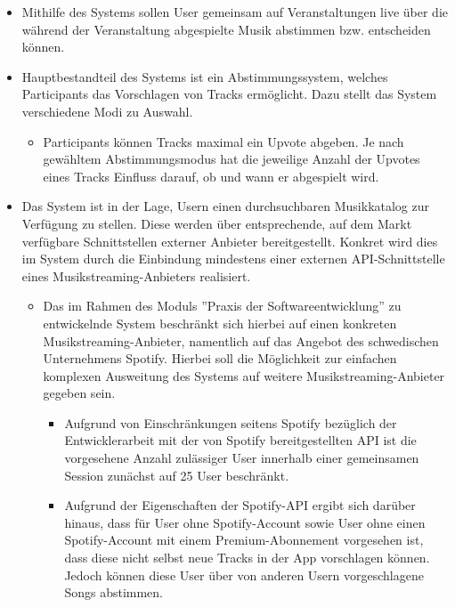\documentclass[oneside, ngerman]{sdqtechreport}
\begin{document}
\begin{itemize}
    \item Mithilfe des Systems sollen User gemeinsam auf Veranstaltungen live über die während der Veranstaltung abgespielte Musik abstimmen bzw. entscheiden können.
    \item Hauptbestandteil des Systems ist ein Abstimmungssystem, welches Participants das Vorschlagen von Tracks ermöglicht. Dazu stellt das System verschiedene Modi zu Auswahl.
    \begin{itemize}
        \item Participants können Tracks maximal ein Upvote abgeben. Je nach gewähltem Abstimmungsmodus hat die jeweilige Anzahl der Upvotes eines Tracks Einfluss darauf, ob und wann er abgespielt wird.
    \end{itemize}
    \item Das System ist in der Lage, Usern einen durchsuchbaren Musikkatalog zur Verfügung zu stellen. Diese werden über entsprechende, auf dem Markt verfügbare Schnittstellen externer Anbieter bereitgestellt. Konkret wird dies im System durch die Einbindung mindestens einer externen API-Schnittstelle eines Musikstreaming-Anbieters realisiert.
    \begin{itemize}
        \item Das im Rahmen des Moduls ''Praxis der Softwareentwicklung'' zu entwickelnde System beschränkt sich hierbei auf einen konkreten Musikstreaming-Anbieter, namentlich auf das Angebot des schwedischen Unternehmens Spotify. Hierbei soll die Möglichkeit zur einfachen komplexen Ausweitung des Systems auf weitere Musikstreaming-Anbieter gegeben sein.
        \begin{itemize}
            \item Aufgrund von Einschränkungen seitens Spotify bezüglich der Entwicklerarbeit mit der von Spotify bereitgestellten API ist die vorgesehene Anzahl zulässiger User innerhalb einer gemeinsamen Session zunächst auf 25 User beschränkt.
            \item Aufgrund der Eigenschaften der Spotify-API ergibt sich darüber hinaus, dass für User ohne Spotify-Account sowie User ohne einen Spotify-Account mit einem Premium-Abonnement vorgesehen ist, dass diese nicht selbst neue Tracks in der App vorschlagen können. Jedoch können diese User über von anderen Usern vorgeschlagene Songs abstimmen.
        \end{itemize}


\end{itemize}
\end{itemize}
\end{document}
